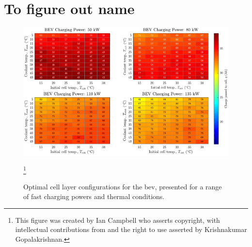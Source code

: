 


\section{To figure out name}\label{sec:Configurations}



\begin{figure}[!bp]
    \begin{minipage}[t]{\textwidth}
        \centering
        \includegraphics[width=\textwidth]{fig_generate_heatmap_BEV}
        \caption[Optimal cell layer configurations for the \gls{bev}, presented for a range of fast charging powers and thermal conditions]{Optimal cell layer configurations for the \gls{bev}, presented for a range of fast charging powers and thermal conditions\footnotemark.}
        \label{fig:fig_generate_heatmap_BEV}
        \mpfootnotes[1]
        \footnote{This figure was created by Ian Campbell who asserts copyright,
            with  intellectual  contributions  from  and   the  right  to  use  asserted  by
        Krishnakumar Gopalakrishnan.}
    \end{minipage}
\end{figure}

